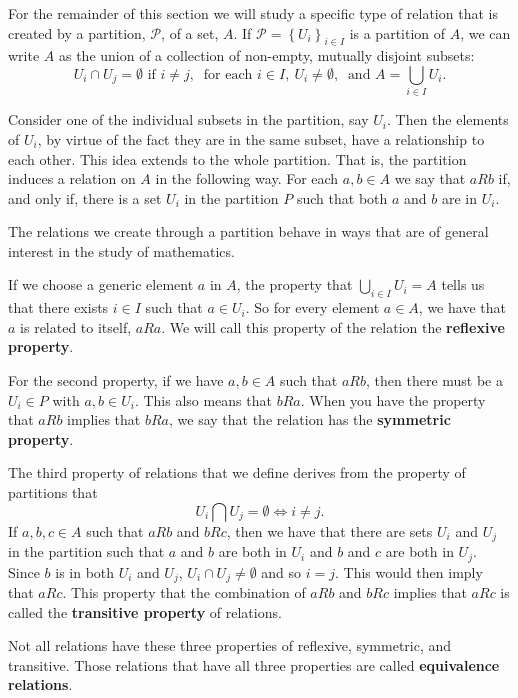 \documentclass[
]{book}
\theoremstyle{definition}
\theoremstyle{definition}
\theoremstyle{definition}
\theoremstyle{definition}
\theoremstyle{remark}
\begin{document}
For the remainder of this section we will study a specific type of relation that is created by a partition, \(\mathcal{P}\), of a set, \(A\). If \(\mathcal{P}=\left\{U_i\right\}_{i\in I}\) is a partition of \(A\), we can write \(A\) as the union of a collection of non-empty, mutually disjoint subsets: \[U_i \cap U_j = \emptyset \mbox{ if } i\neq j, \: \mbox{ for each } i \in I, \: U_i\neq \emptyset, \: \mbox{ and } A=\bigcup_{i\in I} U_i.\]

Consider one of the individual subsets in the partition, say \(U_i\). Then the elements of \(U_i\), by virtue of the fact they are in the same subset, have a relationship to each other. This idea extends to the whole partition. That is, the partition induces a relation on \(A\) in the following way. For each \(a,b\in A\) we say that \(aRb\) if, and only if, there is a set \(U_i\) in the partition \(P\) such that both \(a\) and \(b\) are in \(U_i\).

The relations we create through a partition behave in ways that are of general interest in the study of mathematics.

If we choose a generic element \(a\) in \(A\), the property that \(\bigcup_{i\in I} U_i = A\) tells us that there exists \(i\in I\) such that \(a \in U_i\). So for every element \(a\in A\), we have that \(a\) is related to itself, \(aRa\). We will call this property of the relation the \textbf{reflexive property}.

For the second property, if we have \(a,b\in A\) such that \(aRb\), then there must be a \(U_i\in P\) with \(a,b\in U_i\). This also means that \(bRa\). When you have the property that \(aRb\) implies that \(bRa\), we say that the relation has the \textbf{symmetric property}.

The third property of relations that we define derives from the property of partitions that
\[U_i \bigcap U_j = \emptyset \Leftrightarrow i\neq j.\] If \(a,b,c\in A\) such that \(aRb\) and \(bRc\), then we have that there are sets \(U_i\) and \(U_j\) in the partition such that \(a\) and \(b\) are both in \(U_i\) and \(b\) and \(c\) are both in \(U_j\). Since \(b\) is in both \(U_i\) and \(U_j\), \(U_i \cap U_j \neq \emptyset\) and so \(i=j\). This would then imply that \(aRc\). This property that the combination of \(aRb\) and \(bRc\) implies that \(aRc\) is called the \textbf{transitive property} of relations.

Not all relations have these three properties of reflexive, symmetric, and transitive. Those relations that have all three properties are called \textbf{equivalence relations}.
\end{document}
